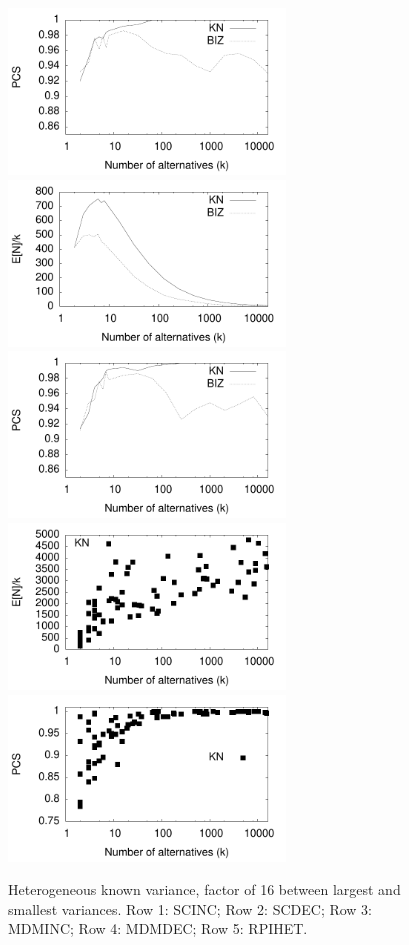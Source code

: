 \documentclass[12pt]{article}
\begin{document}
\begin{figure}[tb]
    \includegraphics[width=2.9in]{pdf/FINAL-MDMINC-PCS}
    \includegraphics[width=2.9in]{pdf/FINAL-MDMDEC-Nk} 
    \includegraphics[width=2.9in]{pdf/FINAL-MDMDEC-PCS}
    \includegraphics[width=2.9in]{pdf/FINAL-RPIHET-Nk} 
    \includegraphics[width=2.9in]{pdf/FINAL-RPIHET-PCS}

    \caption{Heterogeneous known variance, factor of 16 between largest and smallest variances. 
    Row 1: SCINC;
    Row 2: SCDEC;
    Row 3: MDMINC;
    Row 4: MDMDEC;
    Row 5: RPIHET.
    }
  \end{figure}
\end{document}
